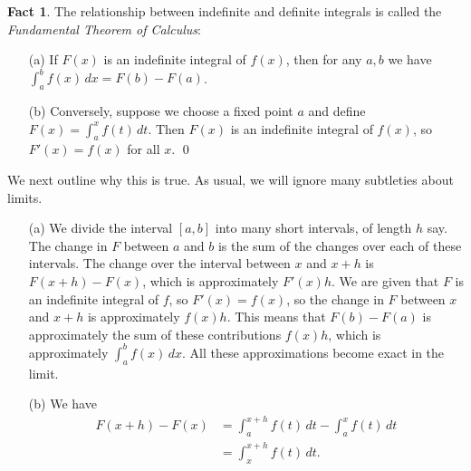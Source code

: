 \documentclass[a4paper]{book}
\newcommand{\PURPLE}[1]{{\color{purple}#1}}
\renewcommand{\:}{\colon}
\newcommand{\DEFN}[1]{\PURPLE{\emph{#1}}}
\theoremstyle{definition}
\newtheorem{fact}[theorem]{Fact}
\begin{document}
\begin{fact}
 The relationship between indefinite and definite integrals is called
 the \DEFN{Fundamental Theorem of Calculus}:
 \begin{itemize}
  \item[(a)] If $F(x)$ is an indefinite integral of $f(x)$, then for
   any $a,b$ we have $\int_a^b f(x)\,dx=F(b)-F(a)$.
  \item[(b)] Conversely, suppose we choose a fixed point $a$ and define
   $F(x)=\int_a^xf(t)\,dt$.  Then $F(x)$ is an indefinite integral of
   $f(x)$, so $F'(x)=f(x)$ for all $x$. \qed
 \end{itemize} 
\end{fact}
We next outline why this is true.  As usual, we will ignore many
subtleties about limits.
\begin{itemize}
 \item[(a)] We divide the interval $[a,b]$ into many short intervals,
  of length $h$ say.  The change in $F$ between $a$ and $b$ is the sum
  of the changes over each of these intervals.  The change over the
  interval between $x$ and $x+h$ is $F(x+h)-F(x)$, which is
  approximately $F'(x)h$.  We are given that $F$ is an indefinite
  integral of $f$, so $F'(x)=f(x)$, so the change in $F$ between $x$
  and $x+h$ is approximately $f(x)h$.  This means that $F(b)-F(a)$ is
  approximately the sum of these contributions $f(x)h$, which is
  approximately $\int_a^bf(x)\,dx$.  All these approximations become
  exact in the limit.
 \item[(b)] We have
  \begin{align*}
   F(x+h) - F(x) &= \int_a^{x+h} f(t)\, dt - \int_a^x f(t)\, dt \\
                 &= \int_x^{x+h} f(t) \,dt.
  \end{align*}
  \begin{center}
\end{center}
\end{itemize}
\end{document}
